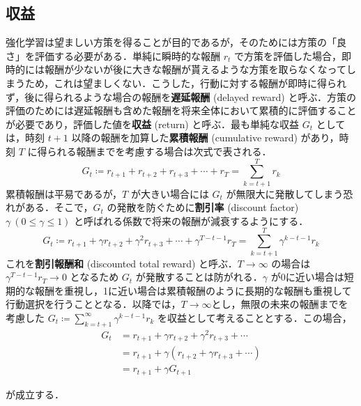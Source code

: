 \subsection{収益}
強化学習は望ましい方策を得ることが目的であるが，そのためには方策の「良さ」を評価する必要がある．単純に瞬時的な報酬 $r_t$ で方策を評価した場合，即時的には報酬が少ないが後に大きな報酬が貰えるような方策を取らなくなってしまうため，これは望ましくない．こうした，行動に対する報酬が即時に得られず，後に得られるような場合の報酬を\textbf{遅延報酬} (delayed reward) と呼ぶ．方策の評価のためには遅延報酬も含めた報酬を将来全体において累積的に評価することが必要であり，評価した値を\textbf{収益} (return) と呼ぶ．最も単純な収益 $G_t$ としては，時刻 $t+1$ 以降の報酬を加算した\textbf{累積報酬} (cumulative reward) があり，時刻 $T$ に得られる報酬までを考慮する場合は次式で表される．
\begin{equation}
G_t \coloneqq  r_{t+1}+r_{t+2}+r_{t+3}+\cdots+r_T = \sum_{k=t+1}^{T}r_{k}
\end{equation}
累積報酬は平易であるが，$T$ が大きい場合には $G_t$ が無限大に発散してしまう恐れがある．そこで，$G_t$ の発散を防ぐために\textbf{割引率} (discount factor) $\gamma\ (0\leq \gamma \leq 1)$ と呼ばれる係数で将来の報酬が減衰するようにする．
\begin{equation}
G_t \coloneqq  r_{t+1}+\gamma r_{t+2}+\gamma^2 r_{t+3}+\cdots+\gamma^{T-t-1}r_T = \sum_{k=t+1}^{T}\gamma^{k-t-1} r_{k}
\end{equation}
これを\textbf{割引報酬和} (discounted total reward) と呼ぶ．$T\to \infty$ の場合は $\gamma^{T-t-1}r_T \to 0$ となるため $G_t$ が発散することは防がれる．$\gamma$ が0に近い場合は短期的な報酬を重視し，1に近い場合は累積報酬のように長期的な報酬も重視して行動選択を行うこととなる．以降では，$T\to \infty$とし，無限の未来の報酬までを考慮した $G_t\coloneqq \sum_{k=t+1}^{\infty}\gamma^{k-t-1} r_{k}$ を収益として考えることとする．この場合，
\begin{align}
G_t &= r_{t+1}+\gamma r_{t+2}+\gamma^2 r_{t+3}+\cdots\\
&=r_{t+1}+\gamma (r_{t+2}+\gamma r_{t+3}+\cdots)\\
&=r_{t+1} + \gamma G_{t+1}
\end{align}
 
が成立する．

